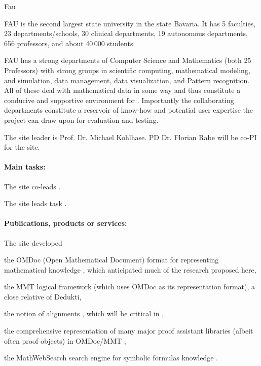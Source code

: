\begin{sitedescription}{Fau}

  
FAU is the second largest state university in the state Bavaria.
It has 5 faculties, 23 departments/schools, 30 clinical departments, 19 autonomous departments, 656 professors, and about 40\,000 students.

FAU has a strong departments of Computer Science and Mathematics (both 25 Professors) with strong groups in scientific computing, mathematical modeling, and simulation, data management, data visualization, and Pattern recognition.
All of these deal with mathematical data in some way and thus constitute a conducive and supportive environment for \pn.
Importantly the collaborating departments constitute a reservoir of know-how and potential user expertise the \pn project can draw upon for evaluation and testing.

The site leader is Prof. Dr. Michael Kohlhase.
PD Dr. Florian Rabe will be co-PI for the site.

\paragraph*{Main tasks:}

\begin{compactitem}
\item The site co-leads .
\item The site leads task .
\end{compactitem}

\paragraph*{Publications, products or services:}

The site developed 
\begin{compactitem}
 \item the OMDoc (Open Mathematical Document) format for representing mathematical knowledge \cite{Kohlhase:OMDoc1.2}, which anticipated much of the research proposed here,
 \item the MMT logical framework \cite{RabKoh:WSMSML13} (which uses OMDoc as its representation format), a close relative of Dedukti,
 \item the notion of alignments \cite{GKKMR:alignments:17}, which will be critical in ,
 \item the comprehensive representation of many major proof assistant libraries (albeit often proof objects) in OMDoc/MMT \cite{KR:oafexp:20},
 \item the MathWebSearch search engine for symbolic formulas knowledge \cite{ProKoh:mwssofse12}.
\end{compactitem}


\end{sitedescription}
